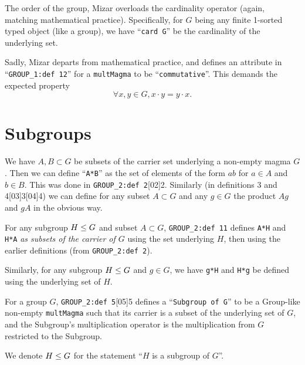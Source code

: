 The order of the group, Mizar overloads the cardinality operator (again,
matching mathematical practice). Specifically,
for $G$ being any finite 1-sorted typed object (like a group), we have
``\verb#card G#'' be the cardinality
of the underlying set.

Sadly, Mizar departs from mathematical practice, and defines an
attribute in ``\verb#GROUP_1:def 12#'' for a \verb#multMagma# to be
``\verb#commutative#''.
This demands the expected property
\begin{equation*}
  \forall x,y\in G, x\cdot y=y\cdot x.
\end{equation*}

\section{Subgroups}

We have $A,B\subset G$ be subsets of the carrier set underlying a
non-empty magma $G$. Then we can define ``\verb#A*B#'' as the set of
elements of the form $ab$ for $a\in A$ and $b\in B$. This was done in
\verb#GROUP_2:def 2#[02]{2}. Similarly (in definitions
3 and 4[03]{3}[04]{4}) we can define
for any subset $A\subset G$ and any $g\in G$ the product $Ag$ and $gA$
in the obvious way.

For any subgroup $H\leq G$ and subset $A\subset G$,
\verb#GROUP_2:def 11# defines \verb$A*H$ and
\verb$H*A$ \emph{as subsets of the carrier of $G$} using the set
underlying $H$, then using the earlier definitions (from
\verb#GROUP_2:def 2#).

Similarly, for any subgroup $H\leq G$ and $g\in G$, we have
\verb#g*H# and \verb#H*g# be defined using the underlying set of $H$.

For a group $G$, \verb#GROUP_2:def 5#[05]{5} defines a
``\verb#Subgroup of G#'' to be a Group-like non-empty \verb#multMagma#
such that its carrier is a subset of the underlying set of $G$, and the
Subgroup's multiplication operator is the multiplication from $G$
restricted to the Subgroup.

\begin{remark}[Notation]
We denote $H\leq G$ for the statement ``$H$ is a subgroup of $G$''.
\end{remark}

